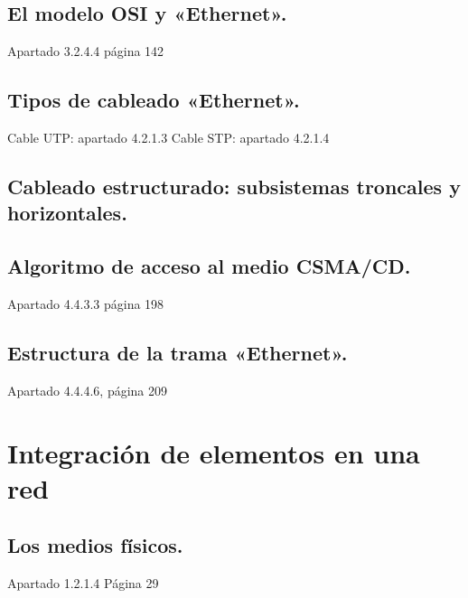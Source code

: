 \documentclass[letterpaper,10pt,spanish]{sphinxmanual}
\begin{document}
\section{El modelo OSI y «Ethernet».}
\label{\detokenize{t1_caracterizacion_redes/apuntes_t1:el-modelo-osi-y-ethernet}}
Apartado 3.2.4.4 página 142


\section{Tipos de cableado «Ethernet».}
\label{\detokenize{t1_caracterizacion_redes/apuntes_t1:tipos-de-cableado-ethernet}}
Cable UTP: apartado 4.2.1.3
Cable STP: apartado 4.2.1.4


\section{Cableado estructurado: subsistemas troncales y horizontales.}
\label{\detokenize{t1_caracterizacion_redes/apuntes_t1:cableado-estructurado-subsistemas-troncales-y-horizontales}}

\section{Algoritmo de acceso al medio CSMA/CD.}
\label{\detokenize{t1_caracterizacion_redes/apuntes_t1:algoritmo-de-acceso-al-medio-csma-cd}}
Apartado 4.4.3.3 página 198


\section{Estructura de la trama «Ethernet».}
\label{\detokenize{t1_caracterizacion_redes/apuntes_t1:estructura-de-la-trama-ethernet}}
Apartado 4.4.4.6, página 209


\chapter{Integración de elementos en una red}
\label{\detokenize{t2_integracion_elementos/apuntes_t2:integracion-de-elementos-en-una-red}}\label{\detokenize{t2_integracion_elementos/apuntes_t2::doc}}

\section{Los medios físicos.}
\label{\detokenize{t2_integracion_elementos/apuntes_t2:los-medios-fisicos}}
Apartado 1.2.1.4 Página 29
\end{document}
